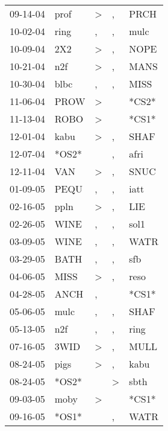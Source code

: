 \begin{supertabular}{lllll}
 09-14-04 &   prof &     \textgreater &                , &   PRCH \\
 10-02-04 &   ring &                , &                , &   mulc \\
 10-09-04 &    2X2 &     \textgreater &                , &   NOPE \\
 10-21-04 &    n2f &     \textgreater &                , &   MANS \\
 10-30-04 &   blbc &                , &                , &   MISS \\
 11-06-04 &   PROW &     \textgreater &                  &  *CS2* \\
 11-13-04 &   ROBO &     \textgreater &                  &  *CS1* \\
 12-01-04 &   kabu &     \textgreater &                , &   SHAF \\
 12-07-04 &  *OS2* &                  &                , &   afri \\
 12-11-04 &    VAN &     \textgreater &                , &   SNUC \\
 01-09-05 &   PEQU &                , &                , &   iatt \\
 02-16-05 &   ppln &     \textgreater &                , &    LIE \\
 02-26-05 &   WINE &                , &                , &   sol1 \\
 03-09-05 &   WINE &                , &                , &   WATR \\
 03-29-05 &   BATH &                , &                , &    sfb \\
 04-06-05 &   MISS &     \textgreater &                , &   reso \\
 04-28-05 &   ANCH &                , &                  &  *CS1* \\
 05-06-05 &   mulc &                , &                , &   SHAF \\
 05-13-05 &    n2f &                , &                , &   ring \\
 07-16-05 &   3WID &     \textgreater &                , &   MULL \\
 08-24-05 &   pigs &     \textgreater &                , &   kabu \\
 08-24-05 &  *OS2* &                  &     \textgreater &   sbth \\
 09-03-05 &   moby &     \textgreater &                  &  *CS1* \\
 09-16-05 &  *OS1* &                  &                , &   WATR \\

\end{supertabular}
